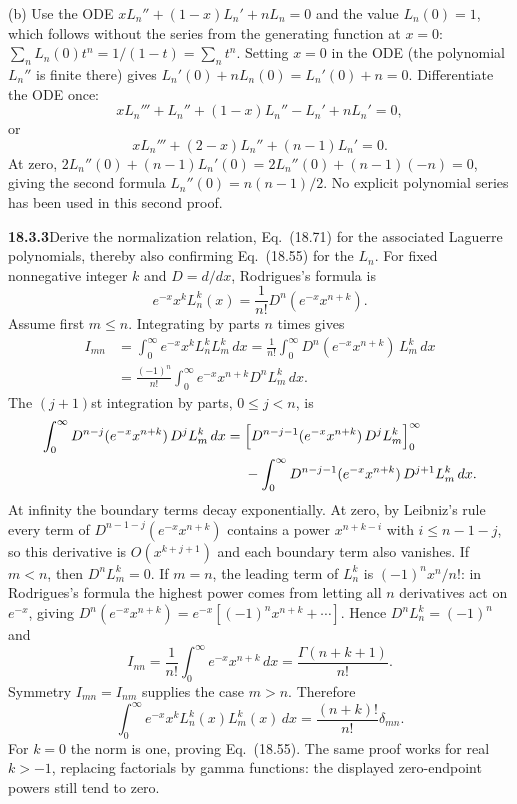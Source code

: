 (b) Use the ODE $xL_n''+(1-x)L_n'+nL_n=0$ and the value $L_n(0)=1$,
which follows without the series from the generating function at
$x=0$: $\sum_nL_n(0)t^n=1/(1-t)=\sum_nt^n$.  Setting $x=0$ in the ODE
(the polynomial $L_n''$ is finite there) gives
$L_n'(0)+nL_n(0)=L_n'(0)+n=0$.  Differentiate the ODE once:
\[
xL_n'''+L_n''+(1-x)L_n''-L_n'+nL_n'=0,
\]
or
\[
xL_n'''+(2-x)L_n''+(n-1)L_n'=0.
\]
At zero, $2L_n''(0)+(n-1)L_n'(0)=2L_n''(0)+(n-1)(-n)=0$, giving
the second formula $L_n''(0)=n(n-1)/2$.
No explicit polynomial series has been used in this second proof.

\par\bigskip
\noindent\textbf{18.3.3}\quad Derive the normalization relation,
Eq.~(18.71) for the associated Laguerre polynomials, thereby also
confirming Eq.~(18.55) for the $L_{n}$.
\solution
For fixed nonnegative integer $k$ and $D=d/dx$, Rodrigues's formula is
\[
e^{-x}x^kL_n^k(x)=\frac1{n!}D^n(e^{-x}x^{n+k}).
\]
Assume first $m\le n$.  Integrating by parts $n$ times gives
\begin{align*}
I_{mn}
 &=\int_0^\infty e^{-x}x^kL_n^kL_m^k\,dx
 =\frac1{n!}\int_0^\infty D^n(e^{-x}x^{n+k})\,L_m^k\,dx\\
 &=\frac{(-1)^n}{n!}\int_0^\infty
        e^{-x}x^{n+k}D^nL_m^k\,dx.
\end{align*}
The $(j+1)$st integration by parts, $0\le j<n$, is
\begin{align*}
\int_0^\infty D^{n-j}(e^{-x}x^{n+k})\,D^jL_m^k\,dx
 ={}&\Bigl[D^{n-j-1}(e^{-x}x^{n+k})\,D^jL_m^k\Bigr]_0^\infty\\
 &-\int_0^\infty D^{n-j-1}(e^{-x}x^{n+k})\,D^{j+1}L_m^k\,dx.
\end{align*}
At infinity the boundary terms decay exponentially.  At zero, by
Leibniz's rule every term of $D^{n-1-j}(e^{-x}x^{n+k})$ contains a
power $x^{n+k-i}$ with $i\le n-1-j$, so this derivative is
$O(x^{k+j+1})$ and each boundary term also vanishes.
If $m<n$, then $D^nL_m^k=0$.  If $m=n$, the leading term of
$L_n^k$ is $(-1)^nx^n/n!$: in Rodrigues's formula the highest power
comes from letting all $n$ derivatives act on $e^{-x}$, giving
$D^n(e^{-x}x^{n+k})=e^{-x}[(-1)^nx^{n+k}+\cdots]$.  Hence
$D^nL_n^k=(-1)^n$ and
\[
I_{nn}=\frac1{n!}\int_0^\infty e^{-x}x^{n+k}\,dx
       =\frac{\Gamma(n+k+1)}{n!}.
\]
Symmetry $I_{mn}=I_{nm}$ supplies the case $m>n$.  Therefore
\[
\boxed{\int_0^\infty e^{-x}x^kL_n^k(x)L_m^k(x)\,dx
 =\frac{(n+k)!}{n!}\delta_{mn}}.
\]
For $k=0$ the norm is one, proving Eq.~(18.55).  The same proof
works for real $k>-1$, replacing factorials by gamma functions:
the displayed zero-endpoint powers still tend to zero.

